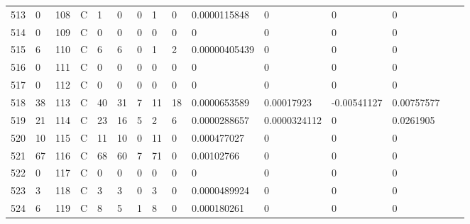 \begin{longtable}{lllllllllllllll}
	513 & 0                 & 108 & C   & 1                 & 0                 & 0                 & 1    & 0          & 0.0000115848   & 0              & 0             & 0            \\
	514 & 0                 & 109 & C   & 0                 & 0                 & 0                 & 0    & 0          & 0              & 0              & 0             & 0            \\
	515 & 6                 & 110 & C   & 6                 & 6                 & 0                 & 1    & 2          & 0.00000405439  & 0              & 0             & 0            \\
	516 & 0                 & 111 & C   & 0                 & 0                 & 0                 & 0    & 0          & 0              & 0              & 0             & 0            \\
	517 & 0                 & 112 & C   & 0                 & 0                 & 0                 & 0    & 0          & 0              & 0              & 0             & 0            \\
	518 & 38                & 113 & C   & 40                & 31                & 7                 & 11   & 18         & 0.0000653589   & 0.00017923     & -0.00541127   & 0.00757577   \\
	519 & 21                & 114 & C   & 23                & 16                & 5                 & 2    & 6          & 0.0000288657   & 0.0000324112   & 0             & 0.0261905    \\
	520 & 10                & 115 & C   & 11                & 10                & 0                 & 11   & 0          & 0.000477027    & 0              & 0             & 0            \\
	521 & 67                & 116 & C   & 68                & 60                & 7                 & 71   & 0          & 0.00102766     & 0              & 0             & 0            \\
	522 & 0                 & 117 & C   & 0                 & 0                 & 0                 & 0    & 0          & 0              & 0              & 0             & 0            \\
	523 & 3                 & 118 & C   & 3                 & 3                 & 0                 & 3    & 0          & 0.0000489924   & 0              & 0             & 0            \\
	524 & 6                 & 119 & C   & 8                 & 5                 & 1                 & 8    & 0          & 0.000180261    & 0              & 0             & 0            \\

\end{longtable}
